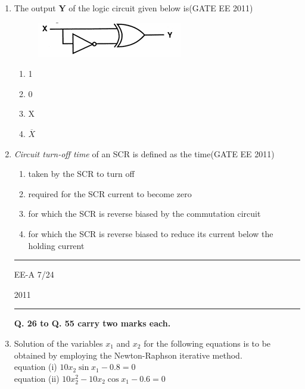\documentclass[a4paper,10pt]{exam}
\theoremstyle{remark}
\begin{document}
\begin{enumerate}
\item The output \textbf{Y} of the logic circuit given below is\hfill{(GATE EE 2011)}

\begin{figure}[H]
    \centering
    \includegraphics[width=0.4\columnwidth]{figs/Q 24.png}\caption{}     \label{fig:myfigure}
\end{figure}

\begin{multicols}{4}
\begin{enumerate}
  \item 1
  \item 0
  \item X
  \item $\overline{X}$
\end{enumerate}
\end{multicols}

\item \textit{Circuit turn-off time} of an SCR is defined as the time\hfill{(GATE EE 2011)}
\begin{enumerate}
  \item taken by the SCR to turn off
  \item required for the SCR current to become zero
  \item for which the SCR is reverse biased by the commutation circuit
  \item for which the SCR is reverse biased to reduce its current below the holding current
\end{enumerate}
\vfill
\noindent\rule{\textwidth}{0.4pt}
\raggedright{EE-A}
\hfill
7/24
\newpage
\raggedright{2011}
\hfill
{}\\

\noindent\rule{\textwidth}{0.4pt}


\raggedright{\textbf{Q. 26 to Q. 55 carry two marks each.}}

\vspace{0.5cm}

\item \quad Solution of the variables $x_1$ and $x_2$ for the following equations is to be obtained by employing the Newton-Raphson iterative method.\\

equation (i) \hspace{4cm}  $10 x_2 \sin x_1 - 0.8 = 0$ \\
equation (ii) \hspace{4cm} $10 x_2^2 - 10 x_2 \cos x_1 - 0.6 = 0$\\



\end{enumerate}
\end{document}
